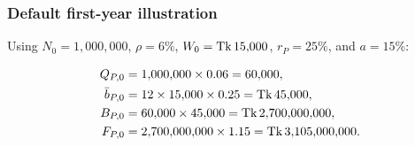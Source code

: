 \subsubsection*{Default first-year illustration}
Using $N_0=1{,}000{,}000$, $\rho=6\%$, $W_0=\text{Tk}\,15{,}000$, $r_P=25\%$, and $a=15\%$:

\begin{align}
Q_{P,0} &=1{,}000{,}000\times0.06=60{,}000,\\
\bar{b}_{P,0} &=12\times15{,}000\times0.25=\text{Tk}\,45{,}000,\\
B_{P,0} &=60{,}000\times45{,}000=\text{Tk}\,2{,}700{,}000{,}000,\\
F_{P,0} &=2{,}700{,}000{,}000\times1.15=\text{Tk}\,3{,}105{,}000{,}000.
\end{align}
